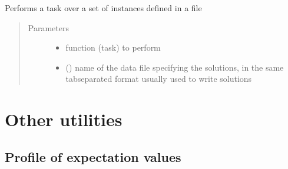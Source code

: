 \documentclass[letterpaper,10pt,english]{sphinxmanual}
\begin{document}

\begin{fulllineitems}
\label{\detokenize{utilities:pyqcm.loop.loop_from_file}}
\sphinxAtStartPar
Performs a task over a set of instances defined in a file
\begin{quote}\begin{description}
\item[{Parameters}] \leavevmode\begin{itemize}
\item {} 
\sphinxAtStartPar
{} \textendash{} function (task) to perform

\item {} 
\sphinxAtStartPar
{} () \textendash{} name of the data file specifying the solutions, in the same tab\sphinxhyphen{}separated format usually used to write solutions

\end{itemize}

\end{description}\end{quote}

\end{fulllineitems}



\chapter{Other utilities}
\label{\detokenize{utilities:other-utilities}}

\section{Profile of expectation values}
\label{\detokenize{utilities:module-pyqcm.profile}}\label{\detokenize{utilities:profile-of-expectation-values}}
\end{document}
